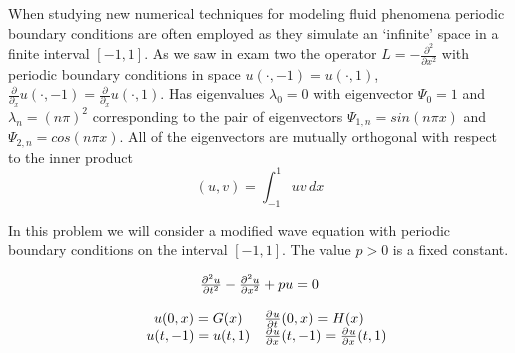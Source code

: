 When studying new numerical techniques for modeling fluid phenomena periodic boundary conditions are often employed as they simulate an `infinite' space in a finite interval $\left[ -1, 1 \right]$.  As we saw in exam two the operator $L = -\frac{\partial^{2}}{\partial x^2}$ with periodic boundary conditions in space $u( \cdot, -1) = u(\cdot,1)$, $\frac{\partial}{\partial_x}u(\cdot,-1) = \frac{\partial}{\partial_{x}}u(\cdot,1)$. Has eigenvalues $\lambda_{0} = 0$ with eigenvector $\Psi_{0} = 1$ and $\lambda_{n} = \left( n\pi \right)^{2}$ corresponding to the pair of eigenvectors $\Psi_{1,n} = sin(n\pi x)$ and $\Psi_{2,n} = cos(n\pi x)$.  All of the eigenvectors are mutually orthogonal with respect to the inner product 
\[
\left(u,v\right) = \int_{-1}^{1} uv \, dx
\]


In this problem we will consider a modified wave equation with periodic boundary conditions on the interval $\left[ -1, 1 \right]$.  The value $p>0$ is a fixed constant.

\begin{equation}\label{eqn:modif_wave_damping}
	\begin{array}{rcl}
		 \multicolumn{3}{c}{  \pd{u}{t}{2}   -  \pd{u}{x}{2} + pu  = 0} \\
		 &&\\
		  & u(0,x)  = G(x) & \pd{u}{t}{}(0,x) = H(x) \\
		 & u(t,-1)  =   u(t,1) & \pd{u}{x}{}(t,-1)  = \pd{u}{x}{}(t,1)
	\end{array}
\end{equation}

